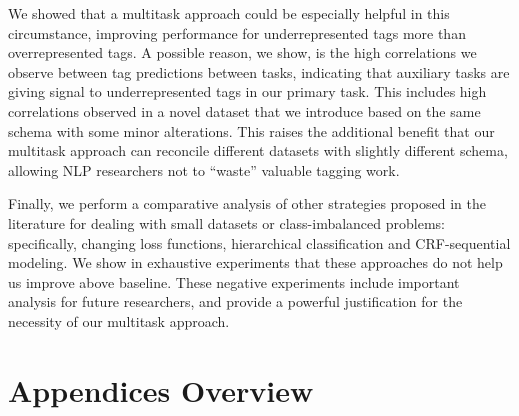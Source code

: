 \documentclass[11pt]{article}
\begin{document}
We showed that a multitask approach could be especially helpful in this circumstance, improving performance for underrepresented tags more than overrepresented tags. A possible reason, we show, is the high correlations we observe between tag predictions between tasks, indicating that auxiliary tasks are giving signal to underrepresented tags in our primary task. This includes high correlations observed in a novel dataset that we introduce based on the same schema with some minor alterations. This raises the additional benefit that our multitask approach can reconcile different datasets with slightly different schema, allowing NLP researchers not to ``waste'' valuable tagging work.


Finally, we perform a comparative analysis of other strategies proposed in the literature for dealing with small datasets or class-imbalanced problems: specifically, changing loss functions, hierarchical classification and CRF-sequential modeling. We show in exhaustive experiments that these approaches do not help us improve above baseline. These negative experiments include important analysis for future researchers, and provide a powerful justification for the necessity of our multitask approach.




\appendix
\section{Appendices Overview} 
\end{document}
